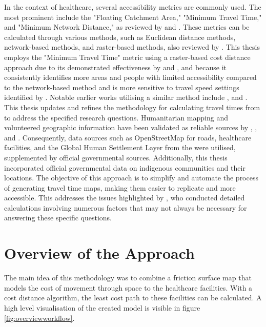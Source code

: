 \documentclass[11pt, a4paper]{report}
\begin{document}
In the context of healthcare, several accessibility metrics are commonly used. The most prominent include the "Floating Catchment Area," "Minimum Travel Time," and "Minimum Network Distance," as reviewed by \citet{neutens_accessibility_2015} and \citet{mark_f_guagliardo_spatial_2004}. These metrics can be calculated through various methods, such as Euclidean distance methods, network-based methods, and raster-based methods, also reviewed by \citet{neutens_accessibility_2015}. This thesis employs the "Minimum Travel Time" metric using a raster-based cost distance approach due to its demonstrated effectiveness by \citet{neutens_accessibility_2015} and \citet{fortney_phd_comparing_2000}, and because it consistently identifies more areas and people with limited accessibility compared to the network-based method and is more sensitive to travel speed settings identified by \citet{delamater_measuring_2012}. Notable earlier works utilising a similar method include \citet{tanser_modelling_2006}, \citet{brabyn_modeling_2002}  and \citet{weiss_global_2020}.\\
%
This thesis updates and refines the methodology for calculating travel times from \citet{weiss_global_2020} to address the specified research questions. Humanitarian mapping and volunteered geographic information have been validated as reliable sources by \citet{goodchild_citizens_2007}, \citet{barron_comprehensive_2014}, and \citet{herfort_evolution_2021}. Consequently, data sources such as OpenStreetMap for roads, healthcare facilities, and the Global Human Settlement Layer from the \citet{european_commission_joint_research_centre_global_2021} were utilised, supplemented by official governmental sources. Additionally, this thesis incorporated official governmental data on indigenous communities and their locations. The objective of this approach is to simplify and automate the process of generating travel time maps, making them easier to replicate and more accessible. This addresses the issues highlighted by \citet{weiss_global_2020}, who conducted detailed calculations involving numerous factors that may not always be necessary for answering these specific questions.

\section{Overview of the Approach}
The main idea of this methodology was to combine a friction surface map that models the cost of movement through space to the healthcare facilities. With a cost distance algorithm, the least cost path to these facilities can be calculated. A high level visualisation of the created model is visible in figure \ref{fig:overviewworkflow}. 
\end{document}
